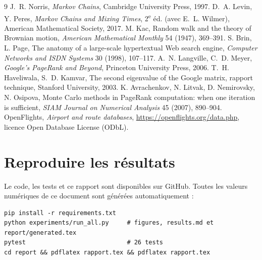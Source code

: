 \documentclass[11pt,a4paper]{article}
\theoremstyle{remark}
\newcommand{\1}{\mathbf{1}}
\begin{document}
\begin{thebibliography}{9}
 J.~R. Norris, \emph{Markov Chains}, Cambridge University Press, 1997.
 D.~A. Levin, Y. Peres, \emph{Markov Chains and Mixing Times}, 2\textsuperscript{e} éd. (avec E.~L. Wilmer), American Mathematical Society, 2017.
 M. Kac, Random walk and the theory of Brownian motion, \emph{American Mathematical Monthly} 54 (1947), 369--391.
 S. Brin, L. Page, The anatomy of a large-scale hypertextual Web search engine, \emph{Computer Networks and ISDN Systems} 30 (1998), 107--117.
 A.~N. Langville, C.~D. Meyer, \emph{Google's PageRank and Beyond}, Princeton University Press, 2006.
 T.~H. Haveliwala, S.~D. Kamvar, The second eigenvalue of the Google matrix, rapport technique, Stanford University, 2003.
 K. Avrachenkov, N. Litvak, D. Nemirovsky, N. Osipova, Monte Carlo methods in PageRank computation: when one iteration is sufficient, \emph{SIAM Journal on Numerical Analysis} 45 (2007), 890--904.
 OpenFlights, \emph{Airport and route databases}, \url{https://openflights.org/data.php}, licence Open Database License (ODbL).
\end{thebibliography}

\appendix
\section{Reproduire les résultats}

Le code, les tests et ce rapport sont disponibles sur GitHub. Toutes les valeurs numériques de ce document sont générées automatiquement :
\begin{verbatim}
pip install -r requirements.txt
python experiments/run_all.py     # figures, results.md et report/generated.tex
pytest                            # 26 tests
cd report && pdflatex rapport.tex && pdflatex rapport.tex
\end{verbatim}
\end{document}

